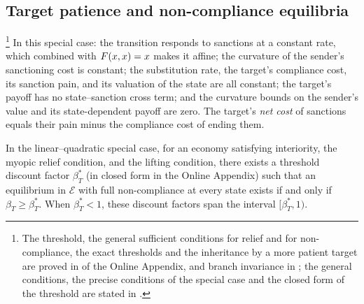 \subsection{Target patience and non-compliance equilibria}
\label{sec:results:patience}
\label{sec:results:bracket}

\footnote{The
threshold, the general sufficient conditions for relief and for non-compliance, the
exact thresholds and the inheritance by a more patient target are proved in
 of the Online Appendix, and branch
invariance in ; the general conditions, the precise
conditions of the special case and the closed form of the threshold are stated in
.} In this special case: the transition responds to sanctions at a constant
rate, which combined with $F(x,x)=x$ makes it affine; the curvature of the sender's
sanctioning cost is constant; the substitution rate, the target's compliance cost, its
sanction pain, and its valuation of the state are all constant; the target's payoff has
no state--sanction cross term; and the curvature bounds on the sender's value and its
state-dependent payoff are zero. The target's \emph{net cost} of sanctions equals their
pain minus the compliance cost of ending them.

\begin{proposition}
\label{prop:collapse-threshold}
In the linear--quadratic special case, for an economy satisfying interiority, the
myopic relief condition, and the lifting condition, there exists a threshold discount
factor $\beta_T^*$ (in closed form in the Online Appendix) such that an equilibrium in
$\mathcal E$ with full non-compliance at every state exists if and only if
$\beta_T\ge\beta_T^*$. When $\beta_T^*<1$, these discount factors span the interval
$[\beta_T^*,1)$.
\end{proposition}

